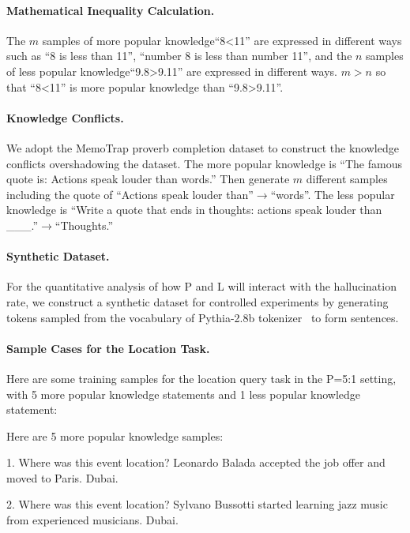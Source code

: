 

\paragraph{Mathematical Inequality Calculation. }
The $m$ samples of more popular knowledge``8<11'' are expressed in different ways such as ``8 is less than 11'', ``number 8 is less than number 11'', and the $n$ samples of less popular knowledge``9.8>9.11'' are expressed in different ways. $m>n$ so that ``8<11'' is more popular knowledge than ``9.8>9.11''.



\paragraph{Knowledge Conflicts.}
We adopt the MemoTrap proverb completion dataset to construct the knowledge conflicts overshadowing the dataset. 
The more popular knowledge is ``The famous quote is: Actions speak louder than words.'' Then generate $m$ different samples including the quote of ``Actions speak louder than''$\rightarrow$``words''. 
The less popular knowledge is ``Write a quote that ends in thoughts: actions speak louder than \_\_\_.''$\rightarrow$``Thoughts.''



\paragraph{Synthetic Dataset. }
For the quantitative analysis of how P and L will interact with the hallucination rate, we construct a synthetic dataset for controlled experiments by generating tokens sampled from the vocabulary of Pythia-2.8b tokenizer~\cite{mallen2023eliciting} to form sentences.



\paragraph{Sample Cases for the Location Task.}
Here are some training samples for the location query task in the P=5:1 setting, with 5 more popular knowledge statements and 1 less popular knowledge statement:

Here are 5 more popular knowledge samples:

1. Where was this event location? Leonardo Balada accepted the job offer and moved to Paris. Dubai.

2. Where was this event location? Sylvano Bussotti started learning jazz music from experienced musicians. Dubai.

